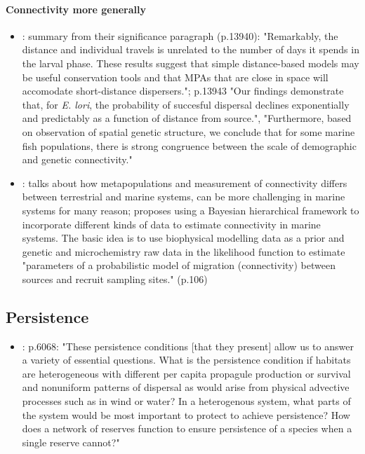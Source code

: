 \documentclass[12pt, oneside]{article}   	%
\begin{document}
\paragraph*{Connectivity more generally}
\begin{itemize}
\item \cite{d2015patterns}: summary from their significance paragraph (p.13940): "Remarkably, the distance and individual travels is unrelated to the number of days it spends in the larval phase. These results suggest that simple distance-based models may be useful conservation tools and that MPAs that are close in space will accomodate short-distance dispersers."; p.13943 "Our findings demonstrate that, for \textit{E. lori}, the probability of succesful dispersal declines exponentially and predictably as a function of distance from source.", "Furthermore, based on observation of spatial genetic structure, we conclude that for some marine fish populations, there is strong congruence between the scale of demographic and genetic connectivity."
\item \cite{gaggiotti2017metapopulations}: talks about how metapopulations and measurement of connectivity differs between terrestrial and marine systems, can be more challenging in marine systems for many reason; proposes using a Bayesian hierarchical framework to incorporate different kinds of data to estimate connectivity in marine systems. The basic idea is to use biophysical modelling data as a prior and genetic and microchemistry raw data in the likelihood function to estimate "parameters of a probabilistic model of migration (connectivity) between sources and recruit sampling sites." (p.106)
\end{itemize}

\subsection*{Persistence}
\begin{itemize}
\item \citep{hastings_persistence_2006}: p.6068: "These persistence conditions [that they present] allow us to answer a variety of essential questions. What is the persistence condition if habitats are heterogeneous with different per capita propagule production or survival and nonuniform patterns of dispersal as would arise from physical advective processes such as in wind or water? In a heterogenous system, what parts of the system would be most important to protect to achieve persistence? How does a network of reserves function to ensure persistence of a species when a single reserve cannot?"
\end{itemize}
\end{document}

